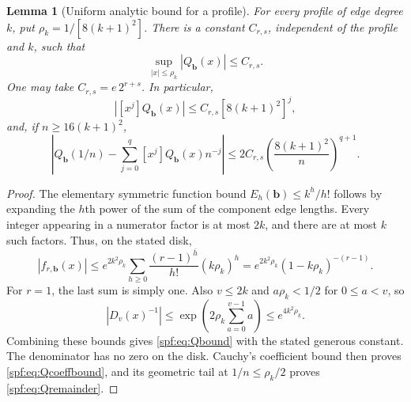 \documentclass[11pt]{article}
\numberwithin{equation}{section}
\newtheorem{lemma}[theorem]{Lemma}
\theoremstyle{definition}
\theoremstyle{remark}
\theoremstyle{definition}
\newcommand{\rise}[2]{{#1}^{\overline{#2}}}
\begin{document}
\begin{lemma}[Uniform analytic bound for a profile]
\label{spf:lem:Qbound}
For every profile of edge degree $k$, put
$\rho_k=1/[8(k+1)^2]$. There is a constant $C_{r,s}$, independent of the
profile and $k$, such that
\begin{equation}
 \sup_{|x|\le\rho_k}|Q_{\mathbf b}(x)|\le C_{r,s}.
 \label{spf:eq:Qbound}
\end{equation}
One may take $C_{r,s}=e\,2^{r+s}$. In particular,
\begin{equation}
 |[x^j]Q_{\mathbf b}(x)|\le C_{r,s}[8(k+1)^2]^j,
 \label{spf:eq:Qcoeffbound}
\end{equation}
and, if $n\ge16(k+1)^2$,
\begin{equation}
 \left|Q_{\mathbf b}(1/n)-\sum_{j=0}^{q}[x^j]Q_{\mathbf b}(x)n^{-j}\right|
 \le2C_{r,s}\left(\frac{8(k+1)^2}{n}\right)^{q+1}.
 \label{spf:eq:Qremainder}
\end{equation}
\end{lemma}
\begin{proof}
The elementary symmetric function bound
$E_h(\mathbf b)\le k^h/h!$ follows by expanding the $h$th power of the sum
of the component edge lengths. Every integer appearing in a numerator factor
is at most $2k$, and there are at most $k$ such factors. Thus, on the stated
disk,
\begin{equation}
 |f_{r,\mathbf b}(x)|
 \le e^{2k^2\rho_k}
       \sum_{h\ge0}\frac{\rise{(r-1)}h}{h!}(k\rho_k)^h
 =e^{2k^2\rho_k}(1-k\rho_k)^{-(r-1)}.
\end{equation}
For $r=1$, the last sum is simply one. Also $v\le2k$ and $a\rho_k<1/2$ for
$0\le a<v$, so
\begin{equation}
 |D_v(x)^{-1}|\le\exp\left(2\rho_k\sum_{a=0}^{v-1}a\right)
                 \le e^{4k^2\rho_k}.
\end{equation}
Combining these bounds gives \eqref{spf:eq:Qbound} with the stated generous
constant. The denominator has no zero on the disk. Cauchy's coefficient bound
then proves \eqref{spf:eq:Qcoeffbound}, and its geometric tail at
$1/n\le\rho_k/2$ proves \eqref{spf:eq:Qremainder}.
\end{proof}
\end{document}
